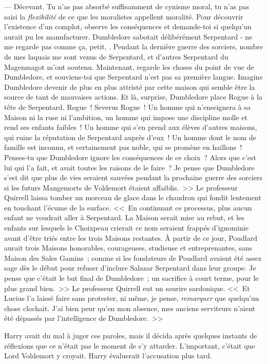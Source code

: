 --- Décevant. Tu n'as pas absorbé suffisamment de cynisme moral, tu n'as pas saisi la \emph{flexibilité} de ce que les moralistes appellent moralité. Pour découvrir l'existence d'un complot, observe les conséquences et demande-toi si quelqu'un aurait pu les manufacturer. Dumbledore sabotait délibérément Serpentard - ne me regarde pas comme ça, petit, . Pendant la dernière guerre des sorciers, nombre de mes laquais me sont venus de Serpentard, et d'autres Serpentard du Magenmagot m'ont soutenu. Maintenant, regarde les choses du point de vue de Dumbledore, et souviens-toi que Serpentard n'est pas sa première langue. Imagine Dumbledore devenir de plus en plus attristé par cette maison qui semble être la source de tant de mauvaises actions. Et là, surprise, Dumbledore place Rogue à la tête de Serpentard. Rogue~! Severus Rogue~! Un homme qui n'enseignera à sa Maison ni la ruse ni l'ambition, un homme qui impose une discipline molle et rend ses enfants faibles~! Un homme qui s'en prend aux élèves d'autres maisons, qui ruine la réputation de Serpentard auprès d'eux~! Un homme dont le nom de famille est inconnu, et certainement pas noble, qui se promène en haillons~! Penses-tu que Dumbledore ignore les conséquences de ce choix~? Alors que c'est lui qui l'a fait, et avait toutes les raisons de le faire~? Je pense que Dumbledore s'est dit que plus de vies seraient sauvées pendant la prochaine guerre des sorciers si les futurs Mangemorts de Voldemort étaient affaiblis.~>> Le professeur Quirrell laissa tomber un morceau de glace dans le chaudron qui fondit lentement en touchant l'écume de la surface. <<~En continuant ce processus, plus aucun enfant ne voudrait aller à Serpentard. La Maison serait mise au rebut, et les enfants sur lesquels le Choixpeau crierait ce nom seraient frappés d'ignominie avant d'être triés entre les trois Maisons restantes. À partir de ce jour, Poudlard aurait trois Maisons honorables, courageuses, studieuse et entreprenantes, sans Maison des Sales Gamins~; comme si les fondateurs de Poudlard avaient été assez sage dès le début pour refuser d'inclure Salazar Serpentard dans leur groupe. Je pense que c'était le but final de Dumbledore~; un sacrifice à court terme, pour le plus grand bien.~>> Le professeur Quirrell eut un sourire sardonique. <<~Et Lucius l'a laissé faire sans protester, ni même, je pense, \emph{remarquer} que quelqu'un chose clochait. J'ai bien peur qu'en mon absence, mes anciens serviteurs n'aient été dépassés par l'intelligence de Dumbledore.~>>

Harry avait du mal à juger ces paroles, mais il décida après quelques instants de réflexions que ce n'était pas le moment de s'y attarder. L'important, c'était que Lord Voldemort y croyait. Harry évaluerait l'accusation plus tard.

